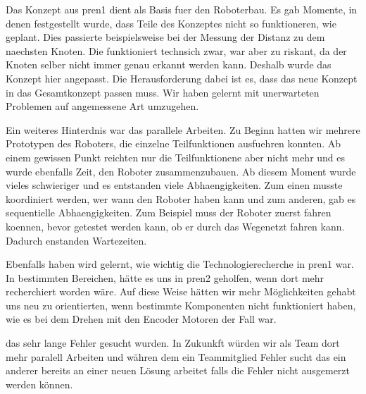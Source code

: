Das Konzept aus \acrshort{pren1} dient als Basis fuer den Roboterbau. Es gab Momente, in denen festgestellt wurde, dass Teile des Konzeptes nicht so funktioneren, wie geplant. Dies passierte beispielsweise bei der Messung der Distanz zu dem naechsten Knoten. Die funktioniert technsich zwar, war aber zu riskant, da der Knoten selber nicht immer genau erkannt werden kann. Deshalb wurde das Konzept hier angepasst. Die Herausforderung dabei ist es, dass das neue Konzept in das Gesamtkonzept passen muss. Wir haben gelernt mit unerwarteten Problemen auf angemessene Art umzugehen.

Ein weiteres Hinterdnis war das parallele Arbeiten. Zu Beginn hatten wir mehrere Prototypen des Roboters, die einzelne Teilfunktionen ausfuehren konnten. Ab einem gewissen Punkt reichten nur die Teilfunktionene aber nicht mehr und es wurde ebenfalls Zeit, den Roboter zusammenzubauen. Ab diesem Moment wurde vieles schwieriger und es entstanden viele Abhaengigkeiten. Zum einen musste koordiniert werden, wer wann den Roboter haben kann und zum anderen, gab es sequentielle Abhaengigkeiten. Zum Beispiel muss der Roboter zuerst fahren koennen, bevor getestet werden kann, ob er durch das Wegenetzt fahren kann. Dadurch enstanden Wartezeiten.

Ebenfalls haben wird gelernt, wie wichtig die Technologierecherche in \acrshort{pren1} war. In bestimmten Bereichen, hätte es uns in \acrshort{pren2} geholfen, wenn dort mehr recherchiert worden wäre. Auf diese Weise hätten wir mehr Möglichkeiten gehabt uns neu zu orientierten, wenn bestimmte Komponenten nicht funktioniert haben, wie es bei dem Drehen mit den Encoder Motoren der Fall war.

das sehr lange Fehler gesucht wurden. In Zukunkft würden wir als Team dort mehr paralell Arbeiten und währen dem ein Teammitglied Fehler sucht das ein anderer bereits an einer neuen Lösung arbeitet falls die Fehler nicht ausgemerzt werden können. 